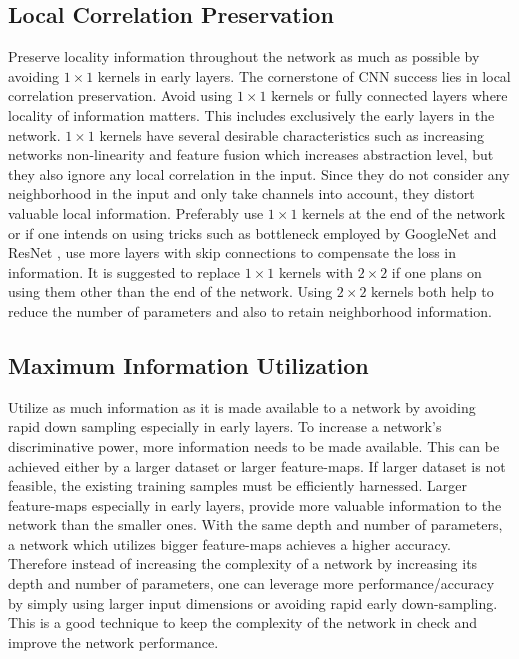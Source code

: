 \documentclass{article} \usepackage{lets_keepit_simple,times}
\begin{document}
\subsection{Local Correlation Preservation}
Preserve locality information throughout the network as much as possible by avoiding $1 \times 1$ kernels in early layers. The cornerstone of CNN success lies in local correlation preservation. Avoid using $1 \times 1$ kernels or fully connected layers where locality of information matters. This includes exclusively the early layers in the network. $1 \times 1$ kernels have several desirable characteristics such as increasing networks non-linearity and feature fusion \cite{Lin_NIN_2013} which increases abstraction level, but they also ignore any local correlation in the input. Since they do not consider any neighborhood in the input and only take channels into account, they distort valuable local information. Preferably use $1 \times 1$ kernels at the end of the network or if one intends on using tricks such as bottleneck employed by GoogleNet \cite{Szegedy_googlenet_2015} and ResNet \cite{He_ResNet_2015}, use more layers with skip connections to compensate the loss in information. It is suggested to replace $1 \times 1$ kernels with $2 \times 2$ if one plans on using them other than the end of the network. Using $2 \times 2$ kernels both help to reduce the number of parameters and also to retain neighborhood information. 
\subsection{Maximum Information Utilization}
Utilize as much information as it is made available to a network by avoiding rapid down sampling especially in early layers. To increase a network's discriminative power, more information needs to be made available. This can be achieved either by a larger dataset or larger feature-maps. If larger dataset is not feasible, the existing training samples must be efficiently harnessed. Larger feature-maps especially in early layers, provide more valuable information to the network than the smaller ones. With the same depth and number of parameters, a network which utilizes bigger feature-maps achieves a higher accuracy. Therefore instead of increasing the complexity of a network by increasing its depth and number of parameters, one can leverage more performance/accuracy by simply using larger input dimensions or avoiding rapid early down-sampling. This is a good technique to keep the complexity of the network in check and improve the network performance. 
\end{document}
